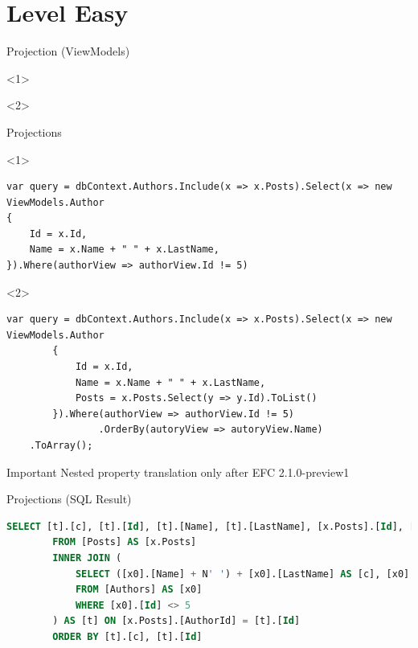 \documentclass{bredelebeamer}
\begin{document}
\section{Level Easy}

\begin{frame}{Projection (ViewModels)}
    \begin{onlyenv}<1>
        
    \end{onlyenv}
    \begin{onlyenv}<2>
        
    \end{onlyenv}
    
\end{frame}

\begin{frame}[fragile]{Projections}
    \begin{onlyenv}<1>
        \begin{lstlisting}
var query = dbContext.Authors.Include(x => x.Posts).Select(x => new ViewModels.Author
{
    Id = x.Id,
    Name = x.Name + " " + x.LastName,
}).Where(authorView => authorView.Id != 5)
        \end{lstlisting}
    \end{onlyenv}
    \begin{onlyenv}<2>
        \begin{lstlisting}
var query = dbContext.Authors.Include(x => x.Posts).Select(x => new ViewModels.Author
        {
            Id = x.Id,
            Name = x.Name + " " + x.LastName,
            Posts = x.Posts.Select(y => y.Id).ToList()
        }).Where(authorView => authorView.Id != 5)
                .OrderBy(autoryView => autoryView.Name)
    .ToArray();
        \end{lstlisting}
        \begin{alertblock}{Important}
            Nested property translation only after EFC 2.1.0-preview1
        \end{alertblock}
    \end{onlyenv}
\end{frame}
\begin{frame}[fragile]{Projections (SQL Result)}
    \begin{lstlisting}[language=SQL]
        SELECT [t].[c], [t].[Id], [t].[Name], [t].[LastName], [x.Posts].[Id], [x.Posts].[AuthorId]
        FROM [Posts] AS [x.Posts]
        INNER JOIN (
            SELECT ([x0].[Name] + N' ') + [x0].[LastName] AS [c], [x0].[Id], [x0].[Name], [x0].[LastName]
            FROM [Authors] AS [x0]
            WHERE [x0].[Id] <> 5
        ) AS [t] ON [x.Posts].[AuthorId] = [t].[Id]
        ORDER BY [t].[c], [t].[Id]
    \end{lstlisting}
\end{frame}
\end{document}
